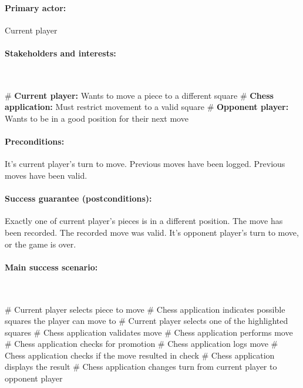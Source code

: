 \documentclass{article}
\begin{document}
\paragraph{Primary actor:} Current player

\paragraph{Stakeholders and interests:}\mbox{}\\
\begin{easylist}[itemize]
# \textbf{Current player:} Wants to move a piece to a different square
# \textbf{Chess application:} Must restrict movement to a valid square
# \textbf{Opponent player:} Wants to be in a good position for their next move
\end{easylist}

\paragraph{Preconditions:} It's current player's turn to move. Previous moves have been logged. Previous moves have been valid.

\paragraph{Success guarantee (postconditions):} Exactly one of current player's pieces is in a different position. The move has been recorded. The recorded move was valid. It's opponent player's turn to move, or the game is over.
\paragraph{Main success scenario:}\mbox{}\\
\begin{easylist}[enumerate]
# Current player selects piece to move
# Chess application indicates possible squares the player can move to
# Current player selects one of the highlighted squares
# Chess application validates move
# Chess application performs move
# Chess application checks for promotion
# Chess application logs move
# Chess application checks if the move resulted in check
# Chess application displays the result
# Chess application changes turn from current player to opponent player
\end{easylist}
\end{document}
